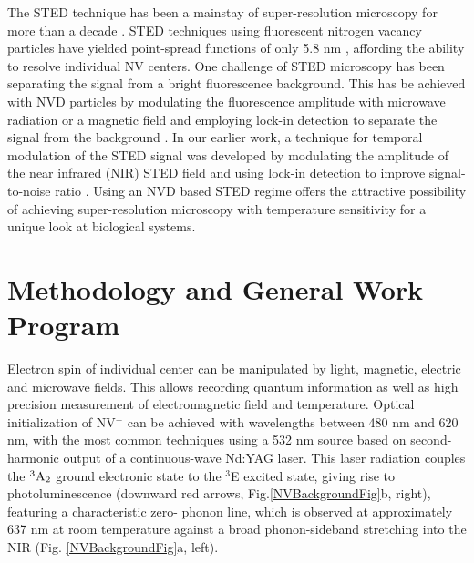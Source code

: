 \documentclass[11pt]{article}
\begin{document}
The STED technique has been a mainstay of super-resolution microscopy for more than a decade
\cite{Hell2003,Hell2009,Eggeling2009}.  STED techniques using fluorescent nitrogen 
vacancy particles have yielded point-spread functions of only 5.8 nm \cite{Rittweger2009,Han2009}, 
affording the ability to resolve individual NV centers.  One 
challenge of STED microscopy has been separating the signal from a bright fluorescence background.  This has be achieved with NVD particles by 
modulating the fluorescence amplitude with microwave radiation or a magnetic field and employing lock-in detection to separate the signal from the 
background \cite{Chapman2013,Sarkar2014}.  In our earlier work, a technique for temporal modulation of the STED signal was developed by modulating the amplitude of the 
near infrared (NIR) STED field and using lock-in detection to improve signal-to-noise ratio \cite{Doronina-Amitonova2015}.  Using an NVD based STED regime offers the 
attractive possibility of achieving super-resolution microscopy with temperature sensitivity for a unique look at biological systems.

\section{Methodology and General Work Program}
Electron spin of individual center can be manipulated by light, magnetic, electric and microwave fields. This
allows recording quantum information as well as high precision measurement of electromagnetic field and
temperature. Optical initialization of NV$^-$ can be achieved with wavelengths between 480 nm and 620
nm, with the most common techniques using a 532 nm source based on second-harmonic output of a continuous-wave 
Nd:YAG laser. This laser radiation couples the $^3\textnormal{A}_2$ ground electronic state to the $^3$E excited 
state, giving rise to
photoluminescence (downward red arrows, Fig.\ref{NVBackgroundFig}b, right), featuring a characteristic zero-
phonon line, which is
observed at approximately 637 nm at room temperature against a broad phonon-sideband stretching into the NIR 
(Fig. \ref{NVBackgroundFig}a, left).
\end{document}
